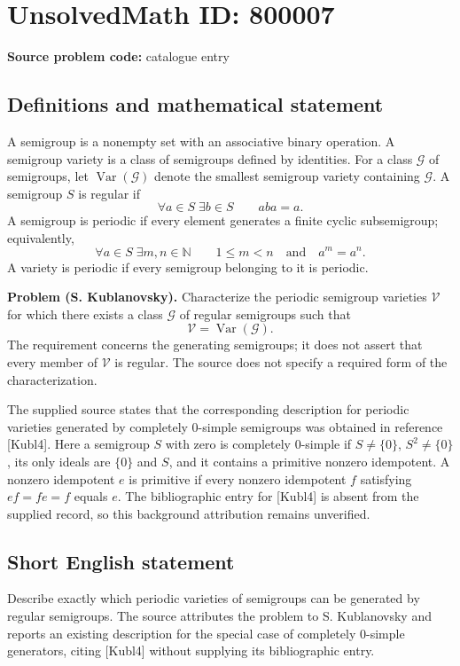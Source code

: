 \documentclass[11pt]{article}
\newcommand{\N}{\mathbb{N}}
\begin{document}
\section*{UnsolvedMath ID: 800007}
\textbf{Source problem code:} catalogue entry
\subsection{Definitions and mathematical statement}
A semigroup is a nonempty set with an associative binary operation. A semigroup variety is a class of semigroups defined by identities. For a class \(\mathcal G\) of semigroups, let \(\operatorname{Var}(\mathcal G)\) denote the smallest semigroup variety containing \(\mathcal G\). A semigroup \(S\) is regular if
\[
\forall a\in S\;\exists b\in S\qquad aba=a.
\]
A semigroup is periodic if every element generates a finite cyclic subsemigroup; equivalently,
\[
\forall a\in S\;\exists m,n\in\N\qquad 1\leq m<n\quad\text{and}\quad a^m=a^n.
\]
A variety is periodic if every semigroup belonging to it is periodic.

\textbf{Problem (S. Kublanovsky).} Characterize the periodic semigroup varieties \(\mathcal V\) for which there exists a class \(\mathcal G\) of regular semigroups such that
\[
\mathcal V=\operatorname{Var}(\mathcal G).
\]
The requirement concerns the generating semigroups; it does not assert that every member of \(\mathcal V\) is regular. The source does not specify a required form of the characterization.

The supplied source states that the corresponding description for periodic varieties generated by completely \(0\)-simple semigroups was obtained in reference [Kubl4]. Here a semigroup \(S\) with zero is completely \(0\)-simple if \(S\neq\{0\}\), \(S^2\neq\{0\}\), its only ideals are \(\{0\}\) and \(S\), and it contains a primitive nonzero idempotent. A nonzero idempotent \(e\) is primitive if every nonzero idempotent \(f\) satisfying \(ef=fe=f\) equals \(e\). The bibliographic entry for [Kubl4] is absent from the supplied record, so this background attribution remains unverified.
\subsection{Short English statement}
Describe exactly which periodic varieties of semigroups can be generated by regular semigroups. The source attributes the problem to S. Kublanovsky and reports an existing description for the special case of completely \(0\)-simple generators, citing [Kubl4] without supplying its bibliographic entry.
\end{document}
